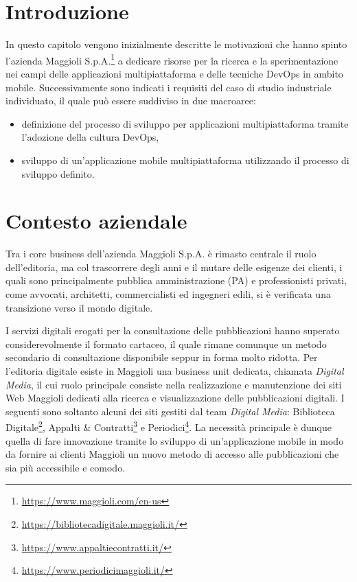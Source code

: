
\section{Introduzione}
In questo capitolo vengono inizialmente descritte le motivazioni che hanno spinto l'azienda Maggioli S.p.A.\footnote{\href{https://www.maggioli.com/en-us}{https://www.maggioli.com/en-us}} a dedicare risorse per la ricerca e la sperimentazione nei campi delle applicazioni multipiattaforma e delle tecniche DevOps in ambito mobile.
Successivamente sono indicati i requisiti del caso di studio industriale individuato, 
il quale può essere suddiviso in due macroaree:

\begin{itemize}
    \item definizione del processo di sviluppo per applicazioni multipiattaforma tramite l'adozione della cultura DevOps,
    
    \item sviluppo di un'applicazione mobile multipiattaforma utilizzando il processo di sviluppo definito.
\end{itemize}

\section{Contesto aziendale}
Tra i core business dell'azienda Maggioli S.p.A. è rimasto centrale il ruolo dell'editoria,
ma col trascorrere degli anni e il mutare delle esigenze dei clienti, 
i quali sono principalmente pubblica amministrazione (PA) e professionisti privati, 
come avvocati, 
architetti, 
commercialisti ed ingegneri edili, 
si è verificata una transizione verso il mondo digitale.

I servizi digitali erogati per la consultazione delle pubblicazioni hanno superato considerevolmente il formato cartaceo,
il quale rimane comunque un metodo secondario di consultazione disponibile seppur in forma molto ridotta. 
Per l'editoria digitale esiste in Maggioli una business unit dedicata, 
chiamata \textit{Digital Media}, 
il cui ruolo principale consiste nella realizzazione e manutenzione dei siti Web Maggioli dedicati alla ricerca e visualizzazione delle pubblicazioni digitali. 
I seguenti sono soltanto alcuni dei siti gestiti dal team \textit{Digital Media}: 
Biblioteca Digitale\footnote{\href{https://bibliotecadigitale.maggioli.it/}{https://bibliotecadigitale.maggioli.it/}}, 
Appalti \& Contratti\footnote{\href{https://www.appaltiecontratti.it/}{https://www.appaltiecontratti.it/}} e Periodici\footnote{\href{https://www.periodicimaggioli.it/}{https://www.periodicimaggioli.it/}}. 
La necessità principale è dunque quella di fare innovazione tramite lo sviluppo di un'applicazione mobile in modo da fornire ai clienti Maggioli un nuovo metodo di accesso alle pubblicazioni che sia più accessibile e comodo.

